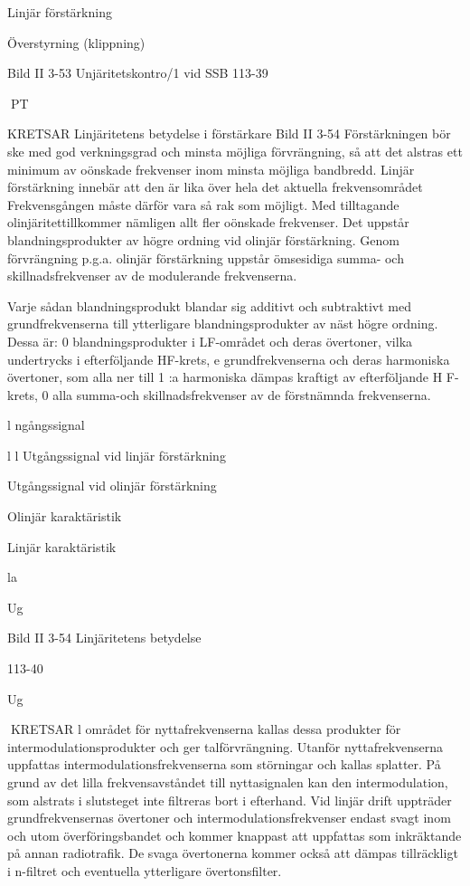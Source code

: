 \documentclass[a4paper,twoside,twocolumn,openright]{book}
\begin{document}
{{{{{{{Linjär förstärkning

Överstyrning (klippning)

Bild II 3-53 Unjäritetskontro/1 vid SSB
113-39

PT

KRETSAR
Linjäritetens betydelse i förstärkare
Bild II 3-54
Förstärkningen bör ske med god verkningsgrad och minsta möjliga förvrängning, så att
det alstras ett minimum av oönskade frekvenser inom minsta möjliga bandbredd.
Linjär förstärkning innebär att den är lika
över hela det aktuella frekvensområdet Frekvensgången måste därför vara så rak som
möjligt. Med tilltagande olinjäritettillkommer
nämligen allt fler oönskade frekvenser.
Det uppstår blandningsprodukter av högre ordning vid olinjär förstärkning. Genom
förvrängning p.g.a. olinjär förstärkning uppstår ömsesidiga summa- och skillnadsfrekvenser av de modulerande frekvenserna.

Varje sådan blandningsprodukt blandar
sig additivt och subtraktivt med grundfrekvenserna till ytterligare blandningsprodukter
av näst högre ordning.
Dessa är:
0
blandningsprodukter i LF-området och
deras övertoner, vilka undertrycks i efterföljande HF-krets,
e
grundfrekvenserna och deras harmoniska
övertoner, som alla ner till 1 :a harmoniska dämpas kraftigt av efterföljande
H F-krets,
0
alla summa-och skillnadsfrekvenser av
de förstnämnda frekvenserna.

l ngångssignal

l  l 
Utgångssignal vid linjär förstärkning

Utgångssignal vid olinjär förstärkning

Olinjär karaktäristik

Linjär karaktäristik

la

Ug

Bild II 3-54 Linjäritetens betydelse

113-40

Ug

KRETSAR
l området för nyttafrekvenserna kallas
dessa produkter för intermodulationsprodukter och ger talförvrängning.
Utanför nyttafrekvenserna uppfattas
intermodulationsfrekvenserna som störningar och kallas splatter. På grund av det
lilla frekvensavståndet till nyttasignalen kan
den intermodulation, som alstrats i slutsteget
inte filtreras bort i efterhand.
Vid linjär drift uppträder grundfrekvensernas övertoner och intermodulationsfrekvenser endast svagt inom och utom överföringsbandet och kommer knappast att uppfattas som inkräktande på annan radiotrafik.
De svaga övertonerna kommer också att
dämpas tillräckligt i n-filtret och eventuella
ytterligare övertonsfilter.

}}}}}}}
\end{document}
